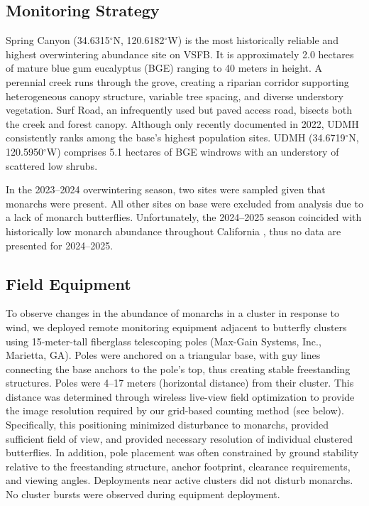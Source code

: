 \documentclass[insects,article,submit,pdftex,moreauthors]{Definitions/mdpi}
\begin{document}
\subsection{Monitoring Strategy}

Spring Canyon (34.6315$^{\circ}$N, 120.6182$^{\circ}$W) is the most historically reliable and highest overwintering abundance site on VSFB. It is approximately 2.0 hectares of mature blue gum eucalyptus (BGE) ranging to 40 meters in height. A perennial creek runs through the grove, creating a riparian corridor supporting heterogeneous canopy structure, variable tree spacing, and diverse understory vegetation. Surf Road, an infrequently used but paved access road, bisects both the creek and forest canopy. Although only recently documented in 2022, UDMH consistently ranks among the base's highest population sites. UDMH (34.6719$^{\circ}$N, 120.5950$^{\circ}$W) comprises 5.1 hectares of BGE windrows with an understory of scattered low shrubs.

In the 2023--2024 overwintering season, two sites were sampled given that monarchs were present. All other sites on base were excluded from analysis due to a lack of monarch butterflies. Unfortunately, the 2024--2025 season coincided with historically low monarch abundance throughout California \cite{xercessocietyWesternMonarchThanksgiving2025}, thus no data are presented for 2024--2025.

\subsection{Field Equipment}

To observe changes in the abundance of monarchs in a cluster in response to wind, we deployed remote monitoring equipment adjacent to butterfly clusters using 15-meter-tall fiberglass telescoping poles (Max-Gain Systems, Inc., Marietta, GA). Poles were anchored on a triangular base, with guy lines connecting the base anchors to the pole's top, thus creating stable freestanding structures. Poles were 4--17 meters (horizontal distance) from their cluster. This distance was determined through wireless live-view field optimization to provide the image resolution required by our grid-based counting method (see below). Specifically, this positioning minimized disturbance to monarchs, provided sufficient field of view, and provided necessary resolution of individual clustered butterflies. In addition, pole placement was often constrained by ground stability relative to the freestanding structure, anchor footprint, clearance requirements, and viewing angles. Deployments near active clusters did not disturb monarchs. No cluster bursts were observed during equipment deployment.
\end{document}
